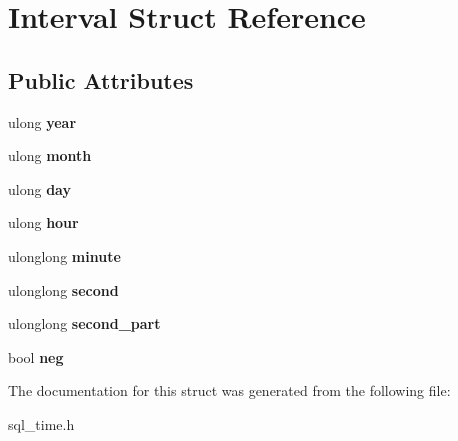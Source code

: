 \hypertarget{structInterval}{}\section{Interval Struct Reference}
\label{structInterval}
\subsection*{Public Attributes}
\begin{DoxyCompactItemize}
\item 
\mbox{\label{structInterval_a7b4fd8a47d1d8b82e16c008cb467dc20}} 
ulong {\bfseries year}
\item 
\mbox{\label{structInterval_a468ff9f47aee1e8da2f4565e6b3397e0}} 
ulong {\bfseries month}
\item 
\mbox{\label{structInterval_a77278b7f18984c66f30bd058103d9e3e}} 
ulong {\bfseries day}
\item 
\mbox{\label{structInterval_aee273c23995878a20a1e24f978e4d446}} 
ulong {\bfseries hour}
\item 
\mbox{\label{structInterval_a54b7764dda440b0e40a71c784efe77c7}} 
ulonglong {\bfseries minute}
\item 
\mbox{\label{structInterval_ab0a05d0ba2e66d9d869d771ebc32cbc5}} 
ulonglong {\bfseries second}
\item 
\mbox{\label{structInterval_a0cc5b6e4ef850c9c2b3d22f9e062455e}} 
ulonglong {\bfseries second\+\_\+part}
\item 
\mbox{\label{structInterval_a213f325d2402c3a895f871389c0fd8e4}} 
bool {\bfseries neg}
\end{DoxyCompactItemize}


The documentation for this struct was generated from the following file\+:\begin{DoxyCompactItemize}
\item 
sql\+\_\+time.\+h\end{DoxyCompactItemize}
